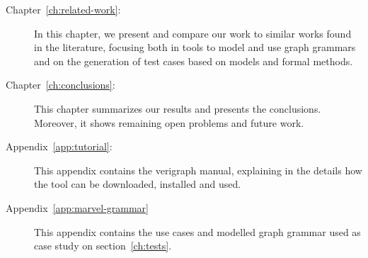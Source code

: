 \begin{description}
  \item[Chapter~\ref{ch:related-work}:] In this chapter, we present and compare our work to similar works found in the literature, focusing both in tools to model and use graph grammars and on the generation of test cases based on models and formal methods.

  \item[Chapter~\ref{ch:conclusions}:] This chapter summarizes our results and presents the conclusions. Moreover, it shows remaining open problems and future work.

  \item[Appendix~\ref{app:tutorial}:] This appendix contains the verigraph manual, explaining in the details how the tool can be downloaded, installed and used.

  \item[Appendix~\ref{app:marvel-grammar}] This appendix contains the use cases and modelled graph grammar used as case study on section~\ref{ch:tests}.
\end{description}

